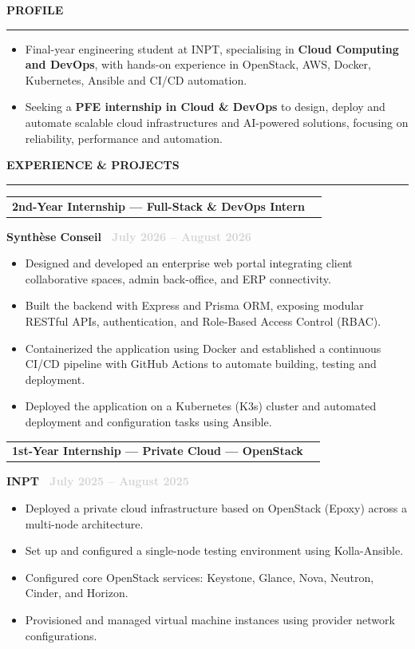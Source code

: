 \documentclass[10.5pt,a4paper]{article}
\makeatletter
\newcommand{\cvsection}[1]{%
  \vspace{8pt}%
  {\large\bfseries\color{heading}\MakeUppercase{#1}}\\[-2pt]%
  {\color{rulecolor}\rule{\linewidth}{1.2pt}}%
  \vspace{4pt}\par
}
\newcommand{\entryheader}[2]{%
  \noindent
  \begin{tabularx}{\linewidth}{@{}X r@{}}
    \textbf{\normalsize #1} & {\small\textcolor{lightgray}{#2}}
  \end{tabularx}\vspace{-1pt}
}
\newcommand{\cvsubline}[1]{%
  {\normalsize\textbf{\textcolor{accent}{#1}}}\par\vspace{2pt}
}
\makeatother
\begin{document}
\noindent
\begin{minipage}[t]{0.64\linewidth}
\vspace{-2pt}


\cvsection{Profile}
\begin{itemize}[leftmargin=1em, topsep=0pt]
  \item Final-year engineering student at INPT, specialising in \textbf{Cloud Computing and DevOps}, with hands-on experience in OpenStack, AWS, Docker, Kubernetes, Ansible and CI/CD automation.

  \item Seeking a \textbf{PFE internship in Cloud \& DevOps} to design, deploy and automate scalable cloud infrastructures and AI-powered solutions, focusing on reliability, performance and automation.
\end{itemize}

\cvsection{Experience \& Projects}

\entryheader{2nd-Year Internship --- Full-Stack \& DevOps Intern}{}
\cvsubline{Synthèse Conseil \hfill {\small\normalfont\textcolor{lightgray}{\faCalendar*\ July 2026 -- August 2026}}}
\begin{itemize}
\item Designed and developed an enterprise web portal integrating client collaborative spaces, admin back-office, and ERP connectivity.
\item Built the backend with Express and Prisma ORM, exposing modular RESTful APIs, authentication, and Role-Based Access Control (RBAC).
\item Containerized the application using Docker and established a continuous CI/CD pipeline with GitHub Actions to automate building, testing and deployment.
\item Deployed the application on a Kubernetes (K3s) cluster and automated deployment and configuration tasks using Ansible.
\end{itemize}

\vspace{4pt}


\entryheader{1st-Year Internship --- Private Cloud --- OpenStack}{}
\cvsubline{INPT \hfill {\small\normalfont\textcolor{lightgray}{\faCalendar*\ July 2025 -- August 2025}}}
\begin{itemize}
\item Deployed a private cloud infrastructure based on OpenStack (Epoxy) across a multi-node architecture.
\item Set up and configured a single-node testing environment using Kolla-Ansible.
\item Configured core OpenStack services: Keystone, Glance, Nova, Neutron, Cinder, and Horizon.
\item Provisioned and managed virtual machine instances using provider network configurations.
\end{itemize}



\end{minipage}
\end{document}
